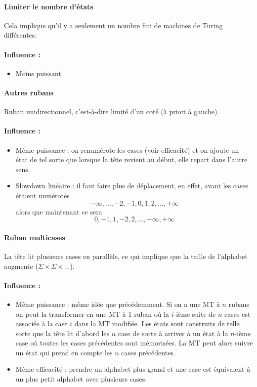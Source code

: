 \paragraph{Limiter le nombre d'états} Cela implique qu'il y a seulement un nombre fini de machines de Turing différentes.

\paragraph{Influence :}
\begin{itemize}
	\item Moins puissant
\end{itemize}

\paragraph{Autres rubans}

Ruban unidirectionnel, c'est-à-dire limité d'un coté (à priori à gauche).

\paragraph{Influence :}
\begin{itemize}
	\item Même puissance : on renumérote les cases (voir efficacité) et on ajoute un état de tel sorte que lorsque la tête revient au début, elle repart dans l'autre sens.
	\item Slowdown linéaire : il faut faire plus de déplacement, en
		effet, avant les cases étaient numérotés
		$$-\infty,...,-2,-1,0,1,2,...,+\infty$$
		alors que maintenant ce sera
	    $$0,-1,1,-2,2,...,-\infty,+\infty$$
\end{itemize}

\paragraph{Ruban multicases} La tête lit plusieurs cases en parallèle, ce qui
implique que la taille de l'alphabet augmente ($\Sigma \times \Sigma \times ...$).

\paragraph{Influence :}
\begin{itemize}
	\item Même puissance : même idée que précédemment. Si on a une MT à $n$ rubans on peut la transformer en une MT à 1 ruban où la $i$-ième suite de $n$ cases est associée à la case $i$ dans la MT modifiée. Les états sont construits de telle sorte que la tête lit d'abord les $n$ case de sorte à arriver à un état à la $n$-ième case où toutes les cases précédentes sont mémorisées. La MT peut alors suivre un état qui prend en compte les $n$ cases précédentes.
	\item Même efficacité : prendre un alphabet plus grand et une case est équivalent à un plus petit alphabet avec plusieurs cases.
\end{itemize}

